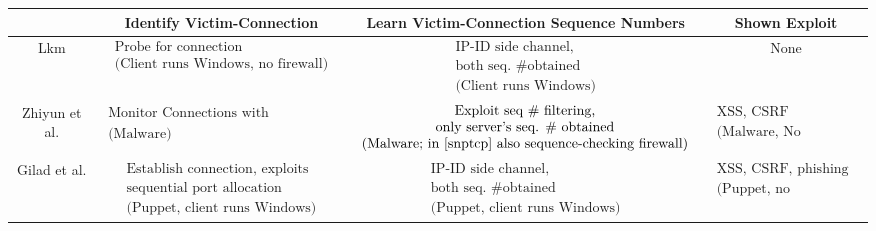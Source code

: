 \documentclass[conference]{IEEEtran}
\begin{document}
\begin{table*}
\centering
\begin{tabular}{ c || c | c | c |}
    \cline{2-4}
                                 & Identify Victim-Connection         & Learn Victim-Connection Sequence Numbers           & Shown Exploit\\ \hline \hline
                                     
        Lkm \cite{lkm:phrack:07} & $\begin{array}{c}\text{Probe for connection} \\ \text{(Client runs Windows, no firewall)}\end{array}$ & $\begin{array}{c}\text{IP-ID side channel,} \\ \text{both seq. \# obtained} \\ \text{(Client runs Windows)}\end{array}$& None\\ \hline

    Zhiyun et al. \cite{snptcp,CCS12:tcp}  & $\begin{array}{c} \text{Monitor Connections with netstat/procfs}\\ \text{(Malware)}\end{array}$& $\begin{array}{c} \text{Exploit seq \# filtering,} \\ \text{only server's seq. \# obtained} \\ \text{(Malware; in \cite{snptcp} also sequence-checking firewall)}\end{array}$& $\begin{array}{c} \text{XSS, CSRF} \\ \text{(Malware, No TLS/SSL)}\end{array}$ \\ \hline
    	
    Gilad et al. \cite{woottcp}  & $\begin{array}{c} \text{Establish connection, exploits} \\ \text{sequential port allocation} \\ \text{(Puppet, client runs Windows)}\end{array}$ & $\begin{array}{c}\text{IP-ID side channel,} \\ \text{both seq. \# obtained} \\ \text{(Puppet, client runs Windows)}\end{array}$& $\begin{array}{c} \text{XSS, CSRF, phishing} \\ \text{(Puppet, no TLS/SSL)}\end{array}$\\ \hline
        

\end{tabular}
\end{table*}
\end{document}
